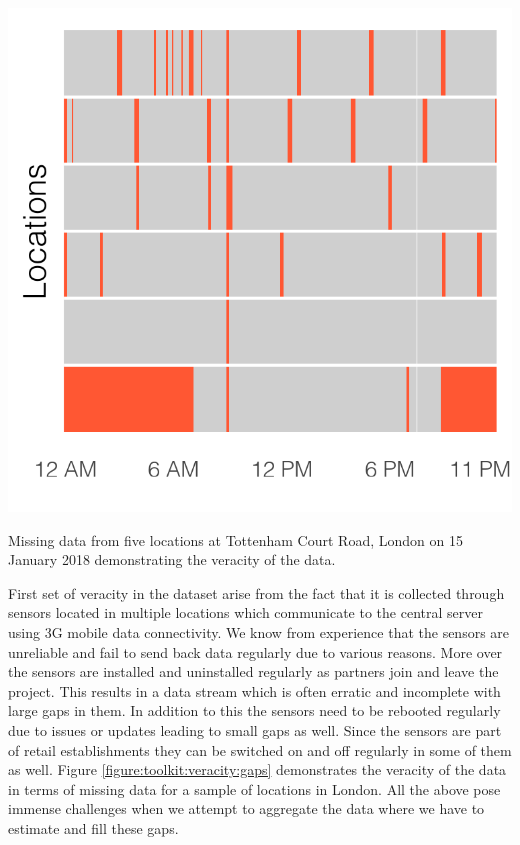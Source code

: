 \begin{marginfigure}
  \includegraphics{images/data-veracity-gaps.png}
  \caption{Missing data from five locations at Tottenham Court Road, London on 15 January 2018 demonstrating the veracity of the data.}
  \label{figure:toolkit:veracity:gaps}
\end{marginfigure}

First set of veracity in the dataset arise from the fact that it is collected through sensors located in multiple locations which communicate to the central server using 3G mobile data connectivity.
We know from experience that the sensors are unreliable and fail to send back data regularly due to various reasons.
More over the sensors are installed and uninstalled regularly as partners join and leave the project.
This results in a data stream which is often erratic and incomplete with large gaps in them.
In addition to this the sensors need to be rebooted regularly due to issues or updates leading to small gaps as well.
Since the sensors are part of retail establishments they can be switched on and off regularly in some of them as well.
Figure \ref{figure:toolkit:veracity:gaps} demonstrates the veracity of the data in terms of missing data for a sample of locations in London.
All the above pose immense challenges when we attempt to aggregate the data where we have to estimate and fill these gaps.

